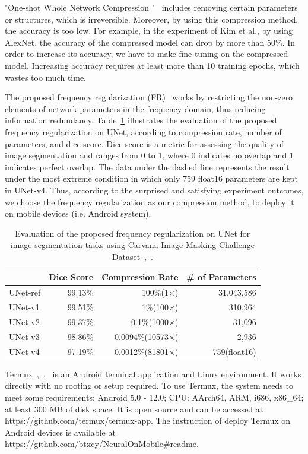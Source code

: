 \documentclass[conference]{IEEEtran}
\begin{document}
"One-shot Whole Network Compression "~\cite{kim2016oneshot} includes removing certain parameters or structures, which is irreversible. Moreover, by using this compression method, the accuracy is too low. For example, in the experiment of Kim et al., by using AlexNet, the accuracy of the compressed model can drop by more than 50\%. In order to increase its accuracy, we have to make fine-tuning on the compressed model. Increasing accuracy requires at least more than 10 training epochs, which wastes too much time.

The proposed frequency regularization (FR)~\cite{zhao2023fr} works by restricting the non-zero elements of network parameters in the frequency domain, thus reducing information redundancy. Table~\ref{table:fr_unet} illustrates the evaluation of the proposed frequency regularization on UNet, according to compression rate, number of parameters, and dice score. Dice score is a metric for assessing the quality of image segmentation and ranges from 0 to 1, where 0 indicates no overlap and 1 indicates perfect overlap. The data under the dashed line represents the result under the most extreme condition in which only 759 float16 parameters are kept in UNet-v4. Thus, according to the surprised and satisfying experiment outcomes, we choose the frequency regularization as our compression method, to deploy it on mobile devices (i.e. Android system).

\begin{table}[H]
	\caption{Evaluation of the proposed frequency regularization on UNet for image segmentation tasks using Carvana Image Masking Challenge Dataset~\cite{zhao2023fr},~\cite{brian2017carvanadataset}.} 
	\label{table:fr_unet}
	\small
	\centering
	\begin{tabular}{p{1.15cm}rrr}
		\toprule
		&Dice Score&Compression Rate&\# of Parameters\\ 
		\midrule\midrule
		UNet-ref&99.13\%&100\%(1×)&31,043,586\\
		UNet-v1&99.51\%&1\%(100×)&310,964\\
		UNet-v2&99.37\%&0.1\%(1000×)&31,096\\
		UNet-v3&98.86\%&0.0094\%(10573×)&2,936\\
		\cdashline{1-4}
		UNet-v4&97.19\%&0.0012\%(81801×)&759(float16)\\
		\bottomrule
	\end{tabular}
\end{table}

Termux~\cite{termux_repo},~\cite{termux_overview},~\cite{termux_wiki}  is an Android terminal application and Linux environment. It works directly with no rooting or setup required. To use Termux, the system needs to meet some requirements: Android 5.0 - 12.0; CPU: AArch64, ARM, i686, x86\_64; at least 300 MB of disk space. It is open source and can be accessed at https://github.com/termux/termux-app. The instruction of deploy Termux on Android devices is available at https://github.com/btxcy/NeuralOnMobile\#readme. 
\end{document}
